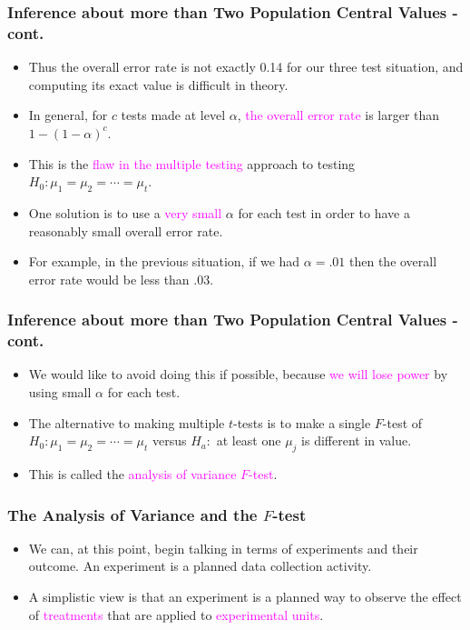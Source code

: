 \documentclass[xcolor=dvipsnames,12pt]{beamer}
\begin{document}
\begin{frame}
\frametitle{Inference about more than Two Population Central Values - cont.}
\begin{itemize}
\item Thus the overall error rate is not exactly 0.14 for
our three test situation, and computing its exact value is
difficult in theory.
\item In general, for $c$ tests made at level $\alpha$,  \textcolor{magenta}{the overall error
rate} is larger than $1-(1-\alpha)^c$.
\item This is the \textcolor{magenta} {flaw in the multiple testing} approach to testing 
$H_0: \mu_1 = \mu_2 = \cdots = \mu_t$.
\item  One solution is to use 
a \textcolor{magenta}{very small} $\alpha$  for each test in order to have a
reasonably small overall error rate.
\item For example, in the previous
situation, if we had $\alpha=.01$ then the overall error rate would
be less than $.03$. 
\end{itemize}
\end{frame}


\begin{frame}
\frametitle{Inference about more than Two Population Central Values - cont.}
\begin{itemize}
\item We would like to avoid doing
this if possible, because  \textcolor{magenta}{we will lose power} by using small $\alpha$ for each test.
\item The alternative to making multiple $t$-tests is to make a single
$F$-test of $H_0: \mu_1 = \mu_2 = \cdots = \mu_t$ versus $H_a:$
at least one $\mu_j$ is different in value.  
\item This is called the \textcolor{magenta}{analysis of variance $F$-test}. 
\end{itemize}
\end{frame}




\begin{frame}
\frametitle{The Analysis of Variance and the $F$-test}
\begin{itemize}
\item We can, at this point, begin talking in terms of experiments and
their outcome. An experiment is a planned data
collection activity. 
\item  A simplistic view is that an experiment is a
planned way to observe the effect of \textcolor{magenta}{treatments} that are
applied to \textcolor{magenta}{experimental units}.
\end{itemize}
\end{frame}
\end{document}
